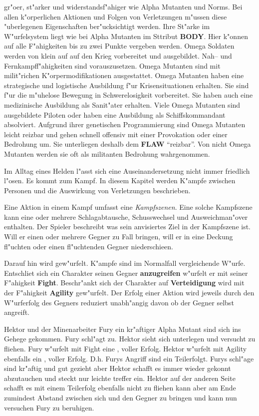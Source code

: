 \begin{description}
        gr"o\3er, st"arker und widerstandsf"ahiger wie Alpha Mutanten und Norms. Bei allen k"orperlichen Aktionen und Folgen von Verletzungen m"ussen diese "uberlegenen Eigenschaften ber"ucksichtigt werden. Ihre St"arke im W"urfelsystem liegt wie bei Alpha Mutanten im Sttribut \textbf{BODY}. Hier k"onnen auf alle F"ahigkeiten bis zu zwei Punkte vergeben werden. Omega Soldaten werden von klein auf auf den Krieg vorbereitet und ausgebildet. Nah-- und Fernkampff"ahigkeiten sind vorauszusetzen. Omega Mutanten sind mit milit"richen K"orpermodifikationen ausgestattet. Omega Mutanten haben eine strategische und logistische Ausbildung f"ur Krisensituationen erhalten. Sie sind f"ur die m"uhelose Bewegung in Schwerelosigkeit vorbereitet. Sie haben auch eine medizinische Ausbildung als Sanit"ater erhalten. Viele Omega Mutanten sind ausgebildete Piloten oder haben eine Ausbildung als Schiffskommandant absolviert. Aufgrund ihrer genetischen Programmierung sind Omega Mutanten leicht reizbar und gehen schnell offensiv mit einer Provokation oder einer Bedrohung um. Sie unterliegen deshalb dem \textbf{FLAW} "`reizbar"'. Von nicht Omega Mutanten werden sie oft als militanten Bedrohung wahrgenommen.
\end{description}

Im Alltag eines Helden l"asst sich eine Auseinandersetzung nicht immer friedlich l"osen. Es kommt zum Kampf. In diesem Kapitel werden K"ampfe zwischen Personen und die Auswirkung von Verletzungen beschrieben.

Eine Aktion in einem Kampf umfasst eine \emph{Kampfszenen}. Eine solche Kampfszene kann eine oder mehrere Schlagabtausche, Schusswechsel und Ausweichman"over enthalten. Der Spieler beschreibt was sein anvisiertes Ziel in der Kampfszene ist. Will er einen oder mehrere Gegner zu Fall bringen, will er in eine Deckung fl"uchten oder einen fl"uchtenden Gegner niederschie\3en. 

Darauf hin wird gew"urfelt. K"ampfe sind im Normalfall vergleichende W"urfe. Entschlie\3t sich ein Charakter seinen Gegner \textbf{anzugreifen} w"urfelt er mit seiner F"ahigkeit \textbf{Fight}. Beschr"ankt sich der Charakter auf \textbf{Verteidigung} wird mit der F"ahigkeit \textbf{Agility} gew"urfelt. Der Erfolg einer Aktion wird jeweils durch den W"urferfolg des Gegners reduziert unabh"angig davon ob der Gegner selbst angreift.

\begin{ruleexample}
    Hektor und der Minenarbeiter Fury ein kr"aftiger Alpha Mutant sind sich ins Gehege gekommen. Fury schl"agt zu. Hektor sieht sich unterlegen und versucht zu fliehen. Fury w"urfelt mit Fight eine , voller Erfolg. Hektor w"urfelt mit Agility ebenfalls ein , voller Erfolg. D.h. Furys Angriff sind ein Teilerfolgt. Furys schl"age sind kr"aftig und gut gezieht aber Hektor schafft es immer wieder gekonnt abzutauchen und steckt nur leichte treffer ein. Hektor auf der anderen Seite schafft es mit einem Teilerfolg ebenfalls nicht zu fliehen kann aber am Ende zumindest Abstand zwischen sich und den Gegner zu bringen und kann nun versuchen Fury zu beruhigen.
\end{ruleexample}

